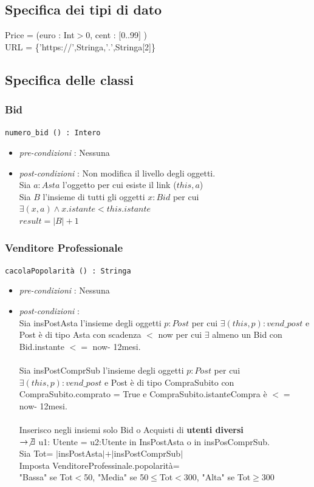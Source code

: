 \documentclass[12pt, letterpaper]{article}
\newcommand{\acc}{\\\hphantom{}\\}
\newcommand{\code}[1]{\colorbox{light-gray}{\texttt{#1}}}
\begin{document}
\subsection{Specifica dei tipi di dato}
Price = (euro : Int$>$0, cent : $[$0..99$]$ ) \\
URL = \{'https://',Stringa,'$.$',Stringa[2]\}\newpage
\subsection{Specifica delle classi}
\subsubsection{Bid}
\code{numero\_bid () : Intero}\begin{itemize}
    \item \textit{pre-condizioni} : Nessuna
    \item \textit{post-condizioni} : Non modifica il livello degli oggetti.\\ 
    Sia $a:Asta$ l'oggetto per cui esiste il link ($this,a$)\\ 
    Sia $B$ l'insieme di tutti gli oggetti $x:Bid$ per cui $\exists (x,a) \land x.istante<this.istante$\\ 
    $result = |B|+1$ 
\end{itemize}
\subsubsection{Venditore Professionale}
\code{cacolaPopolarità () : Stringa}\begin{itemize}
    \item \textit{pre-condizioni} : Nessuna
    \item \textit{post-condizioni} : \\Sia insPostAsta l'insieme degli oggetti $p:Post$ per cui $\exists (this,p):vend\_post$ e Post è di tipo Asta con scadenza $<$ now per cui $\exists$ almeno un Bid con Bid.instante $<=$ now- 12mesi.\acc
                                    Sia insPostComprSub l'insieme degli oggetti $p:Post$ per cui $\exists (this,p):vend\_post$ e Post è di tipo CompraSubito con CompraSubito.comprato = True e CompraSubito.istanteCompra è $<=$ now- 12mesi.\acc
                                    Inserisco negli insiemi solo Bid o Acquisti di \textbf{utenti diversi}\\ $\rightarrow \not \exists$ u1: Utente = u2:Utente in InsPostAsta o in insPosComprSub. \\
                                    Sia Tot= $|$insPostAsta$|+|$insPostComprSub$|$\\
                                    Imposta VenditoreProfessinale.popolarità=\\ "Bassa" se Tot$<$50, "Media" se 50$\le$Tot$<$300, "Alta" se Tot$\ge$300

\end{itemize}
\end{document}
